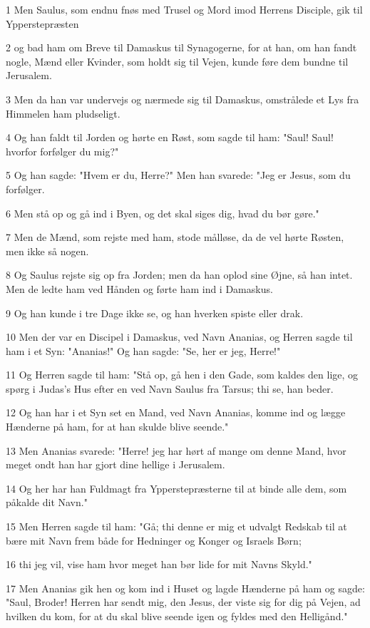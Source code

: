 \par 1 Men Saulus, som endnu fnøs med Trusel og Mord imod Herrens Disciple, gik til Ypperstepræsten
\par 2 og bad ham om Breve til Damaskus til Synagogerne, for at han, om han fandt nogle, Mænd eller Kvinder, som holdt sig til Vejen, kunde føre dem bundne til Jerusalem.
\par 3 Men da han var undervejs og nærmede sig til Damaskus, omstrålede et Lys fra Himmelen ham pludseligt.
\par 4 Og han faldt til Jorden og hørte en Røst, som sagde til ham: "Saul! Saul! hvorfor forfølger du mig?"
\par 5 Og han sagde: "Hvem er du, Herre?" Men han svarede: "Jeg er Jesus, som du forfølger.
\par 6 Men stå op og gå ind i Byen, og det skal siges dig, hvad du bør gøre."
\par 7 Men de Mænd, som rejste med ham, stode målløse, da de vel hørte Røsten, men ikke så nogen.
\par 8 Og Saulus rejste sig op fra Jorden; men da han oplod sine Øjne, så han intet. Men de ledte ham ved Hånden og førte ham ind i Damaskus.
\par 9 Og han kunde i tre Dage ikke se, og han hverken spiste eller drak.
\par 10 Men der var en Discipel i Damaskus, ved Navn Ananias, og Herren sagde til ham i et Syn: "Ananias!" Og han sagde: "Se, her er jeg, Herre!"
\par 11 Og Herren sagde til ham: "Stå op, gå hen i den Gade, som kaldes den lige, og spørg i Judas's Hus efter en ved Navn Saulus fra Tarsus; thi se, han beder.
\par 12 Og han har i et Syn set en Mand, ved Navn Ananias, komme ind og lægge Hænderne på ham, for at han skulde blive seende."
\par 13 Men Ananias svarede: "Herre! jeg har hørt af mange om denne Mand, hvor meget ondt han har gjort dine hellige i Jerusalem.
\par 14 Og her har han Fuldmagt fra Ypperstepræsterne til at binde alle dem, som påkalde dit Navn."
\par 15 Men Herren sagde til ham: "Gå; thi denne er mig et udvalgt Redskab til at bære mit Navn frem både for Hedninger og Konger og Israels Børn;
\par 16 thi jeg vil, vise ham hvor meget han bør lide for mit Navns Skyld."
\par 17 Men Ananias gik hen og kom ind i Huset og lagde Hænderne på ham og sagde: "Saul, Broder! Herren har sendt mig, den Jesus, der viste sig for dig på Vejen, ad hvilken du kom, for at du skal blive seende igen og fyldes med den Helligånd."
